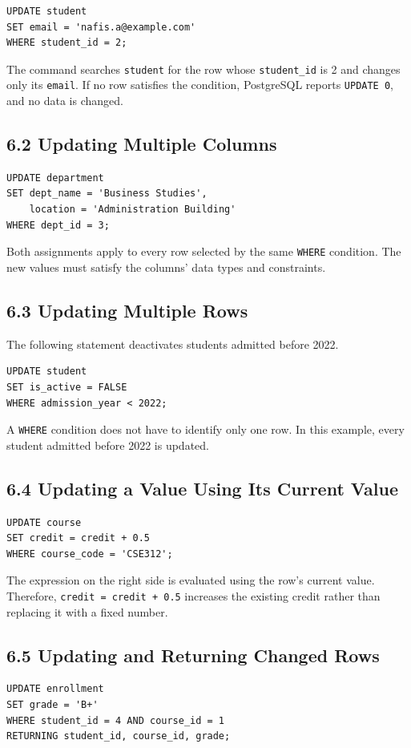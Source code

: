 \documentclass[12pt,a4paper]{article}
\begin{document}
\begin{verbatim}
UPDATE student
SET email = 'nafis.a@example.com'
WHERE student_id = 2;
\end{verbatim}

\noindent The command searches \texttt{student} for the row whose \texttt{student\_id} is 2 and
changes only its \texttt{email}. If no row satisfies the condition, PostgreSQL reports
\texttt{UPDATE 0}, and no data is changed.

\subsection*{6.2 Updating Multiple Columns}
\begin{verbatim}
UPDATE department
SET dept_name = 'Business Studies',
    location = 'Administration Building'
WHERE dept_id = 3;
\end{verbatim}

\noindent Both assignments apply to every row selected by the same \texttt{WHERE} condition. The
new values must satisfy the columns' data types and constraints.

\subsection*{6.3 Updating Multiple Rows}
The following statement deactivates students admitted before 2022.

\begin{verbatim}
UPDATE student
SET is_active = FALSE
WHERE admission_year < 2022;
\end{verbatim}

\noindent A \texttt{WHERE} condition does not have to identify only one row. In this example, every
student admitted before 2022 is updated.

\subsection*{6.4 Updating a Value Using Its Current Value}
\begin{verbatim}
UPDATE course
SET credit = credit + 0.5
WHERE course_code = 'CSE312';
\end{verbatim}

\noindent The expression on the right side is evaluated using the row's current value. Therefore,
\texttt{credit = credit + 0.5} increases the existing credit rather than replacing it with a fixed
number.

\subsection*{6.5 Updating and Returning Changed Rows}
\begin{verbatim}
UPDATE enrollment
SET grade = 'B+'
WHERE student_id = 4 AND course_id = 1
RETURNING student_id, course_id, grade;
\end{verbatim}
\end{document}
